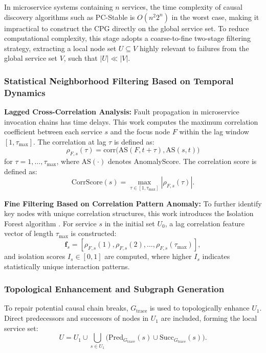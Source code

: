 \documentclass[conference]{IEEEtran}
\begin{document}
In microservice systems containing $n$ services, the time complexity of causal discovery algorithms such as PC-Stable \cite{pcstable} is $O(n^2 2^{n})$ in the worst case, making it impractical to construct the CPG directly on the global service set. To reduce computational complexity, this stage adopts a coarse-to-fine two-stage filtering strategy, extracting a local node set $U \subseteq V$ highly relevant to failures from the global service set $V$, such that $|U| \ll |V|$.

\subsubsection{Statistical Neighborhood Filtering Based on Temporal Dynamics}

\textbf{Lagged Cross-Correlation Analysis:} Fault propagation in microservice invocation chains has time delays. This work computes the maximum correlation coefficient between each service $s$ and the focus node $F$ within the lag window $[1, \tau_{\max}]$. The correlation at lag $\tau$ is defined as:
{\small
\begin{equation}
\rho_{F,s}(\tau) = \text{corr}\big(\text{AS}(F,t\!+\!\tau), \text{AS}(s,t)\big)
\end{equation}}%
for $\tau = 1,\ldots,\tau_{\max}$, where $\text{AS}(\cdot)$ denotes AnomalyScore. The correlation score is defined as:
\begin{equation}
\text{CorrScore}(s) = \max_{\tau \in [1,\tau_{\max}]} |\rho_{F,s}(\tau)|.
\end{equation}

\textbf{Fine Filtering Based on Correlation Pattern Anomaly:} To further identify key nodes with unique correlation structures, this work introduces the Isolation Forest algorithm \cite{isoforest}. For service $s$ in the initial set $U_0$, a lag correlation feature vector of length $\tau_{\max}$ is constructed:
\begin{equation}
\mathbf{f}_s = [\rho_{F,s}(1), \rho_{F,s}(2), \ldots, \rho_{F,s}(\tau_{\max})],
\end{equation}
and isolation scores $I_s \in [0,1]$ are computed, where higher $I_s$ indicates statistically unique interaction patterns.

\subsubsection{Topological Enhancement and Subgraph Generation}

To repair potential causal chain breaks, $G_{\text{trace}}$ is used to topologically enhance $U_1$. Direct predecessors and successors of nodes in $U_1$ are included, forming the local service set:
\begin{equation}
U = U_1 \cup \bigcup_{s \in U_1} \big(\text{Pred}_{G_{\text{trace}}}(s) \cup \text{Succ}_{G_{\text{trace}}}(s)\big).
\end{equation}
\end{document}
